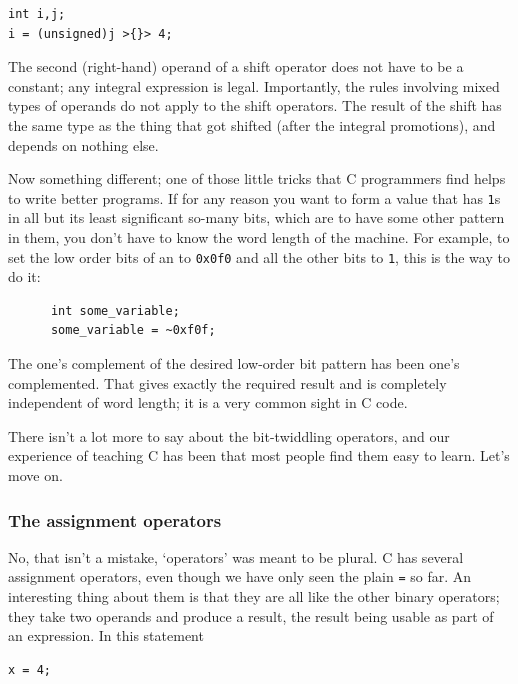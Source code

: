     \begin{Verbatim}
int i,j;
i = (unsigned)j >{}> 4;
\end{Verbatim}

    The second (right-hand) operand of a shift operator does not have to be
     a constant; any integral expression is legal. Importantly, the rules
     involving mixed types of operands do not apply to the shift operators.
     The result of the shift has the same type as the thing that got shifted
     (after the integral promotions), and depends on nothing else.


    Now something different; one of those little tricks that
     C programmers find helps to write better programs. If for any reason
     you want to form a value that has \texttt{1}s in all but its
     least significant so-many bits, which are to have some other pattern in
     them, you don't have to know the word length of the machine. For example,
     to set the low order bits of an \kint{}
     to \texttt{0x0f0} and all the other bits to \texttt{1},
     this is the way to do it:


    \begin{Verbatim}
      int some_variable;
      some_variable = ~0xf0f;
    \end{Verbatim}

    The one's complement of the desired low-order bit pattern has been
     one's complemented. That gives exactly the required result and is
     completely independent of word length; it is a very common sight in
     C code.


    There isn't a lot more to say about the bit-twiddling operators, and
     our experience of teaching C has been that most people find them
     easy to learn. Let's move on.


   

   \subsubsection{The assignment operators}
    

    No, that isn't a mistake, `operators' was meant to be plural.
     C has several assignment operators, even though we have only seen
     the plain \texttt{=} so far. An interesting thing about them is
     that they are all like the other binary operators; they take two operands
     and produce a result, the result being usable as part of an expression.
     In this statement


    \begin{Verbatim}
x = 4;
\end{Verbatim}

